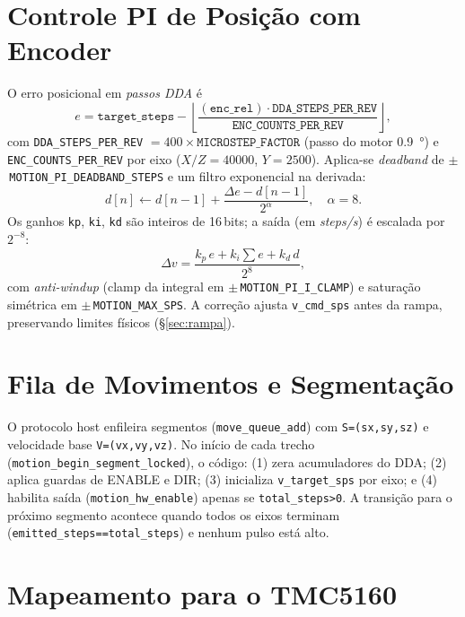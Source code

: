 \FloatBarrier
\section{Controle PI de Posi\c{c}\~ao com Encoder}
\label{sec:pi}

O erro posicional em \emph{passos DDA} \'e
\[
e = \texttt{target\_steps} - \left\lfloor \frac{(\texttt{enc\_rel})\cdot \texttt{DDA\_STEPS\_PER\_REV}}{\texttt{ENC\_COUNTS\_PER\_REV}} \right\rfloor,
\]
com \texttt{DDA\_STEPS\_PER\_REV} $= 400 \times \texttt{MICROSTEP\_FACTOR}$ (passo do motor \SI{0,9}{\degree}) e
\texttt{ENC\_COUNTS\_PER\_REV} por eixo ($X/Z=\num{40000}$, $Y=\num{2500}$).
Aplica-se \emph{deadband} de $\pm$\,\texttt{MOTION\_PI\_DEADBAND\_STEPS} e um filtro exponencial na derivada:
\[
d[n] \leftarrow d[n-1] + \frac{\Delta e - d[n-1]}{2^{\alpha}},\quad \alpha=8.
\]
Os ganhos \texttt{kp}, \texttt{ki}, \texttt{kd} s\~ao inteiros de 16\,bits; a sa\'ida (em \emph{steps/s}) \'e escalada por $2^{-8}$:
\[
\Delta v = \frac{k_p\,e + k_i \sum e + k_d\,d}{2^{8}},
\]
com \emph{anti-windup} (clamp da integral em $\pm\,$\texttt{MOTION\_PI\_I\_CLAMP}) e satura\c{c}\~ao sim\'etrica em $\pm\,$\texttt{MOTION\_MAX\_SPS}. A corre\c{c}\~ao ajusta \texttt{v\_cmd\_sps} antes da rampa, preservando limites f\'isicos (\S\ref{sec:rampa}).

\FloatBarrier
\section{Fila de Movimentos e Segmenta\c{c}\~ao}
\label{sec:fila}

O protocolo host enfileira segmentos (\texttt{move\_queue\_add}) com \texttt{S=(sx,sy,sz)} e velocidade base \texttt{V=(vx,vy,vz)}.
No in\'icio de cada trecho (\texttt{motion\_begin\_segment\_locked}), o c\'odigo:
(1) zera acumuladores do DDA; (2) aplica guardas de ENABLE e DIR; (3) inicializa \texttt{v\_target\_sps} por eixo; e
(4) habilita sa\'ida (\texttt{motion\_hw\_enable}) apenas se \texttt{total\_steps>0}.
A transi\c{c}\~ao para o pr\'oximo segmento acontece quando todos os eixos terminam (\texttt{emitted\_steps==total\_steps}) e nenhum pulso est\'a alto.

\FloatBarrier
\section{Mapeamento para o TMC5160}
\label{sec:tmc-mapeamento}

